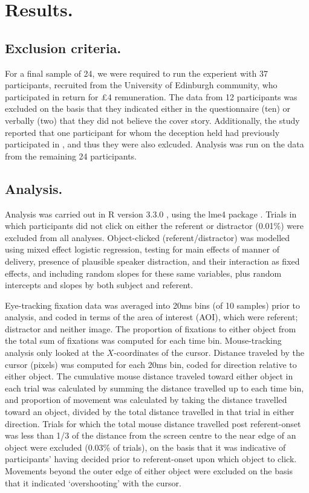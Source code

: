 \documentclass[a4paper,man,natbib]{apa6}
\begin{document}
\section{Results.}
\subsection{Exclusion criteria.}
For a final sample of 24, we were required to run the experient with 37 participants, recruited from the University of Edinburgh community, who participated in return for £4 remuneration. 
The data from 12 participants was excluded on the basis that they indicated either in the questionnaire (ten) or verbally (two) that they did not believe the cover story. 
Additionally, the study reported that one participant for whom the deception held had previously participated in \citet{Loy2016}, and thus they were also exlcuded. 
Analysis was run on the data from the remaining 24 participants.


\subsection{Analysis.}
Analysis was carried out in R version 3.3.0 \citep{rbase}, using the lme4 package \citep{lme4}. 
Trials in which participants did not click on either the referent or distractor (0.01\%) were excluded from all analyses. 
Object-clicked (referent/distractor) was modelled using mixed effect logistic regression, testing for main effects of manner of delivery, presence of plausible speaker distraction, and their interaction as fixed effects, and including random slopes for these same variables, plus random intercepts and slopes by both subject and referent.


Eye-tracking fixation data was averaged into 20ms bins (of 10 samples) prior to analysis, and coded in terms of the area of interest (AOI), which were referent; distractor and neither image. 
The proportion of fixations to either object from the total sum of fixations was computed for each time bin. 
Mouse-tracking analysis only looked at the $X$-coordinates of the cursor.
Distance traveled by the cursor (pixels) was computed for each 20ms bin, coded for direction relative to either object. 
The cumulative mouse distance traveled toward either object in each trial was calculated by summing the distance travelled up to each time bin, and proportion of movement was calculated by taking the distance travelled toward an object, divided by the total distance travelled in that trial in either direction. 
Trials for which the total mouse distance travelled post referent-onset was less than 1/3 of the distance from the screen centre to the near edge of an object were excluded (0.03\% of trials), on the basis that it was indicative of participants' having decided prior to referent-onset upon which object to click. 
Movements beyond the outer edge of either object were excluded on the basis that it indicated `overshooting' with the cursor.
\end{document}
